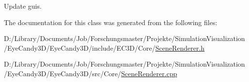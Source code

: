 Update guis. 



The documentation for this class was generated from the following files\+:\begin{DoxyCompactItemize}
\item 
D\+:/\+Library/\+Documents/\+Job/\+Forschungsmaster/\+Projekte/\+Simulation\+Visualization/\+Eye\+Candy3\+D/\+Eye\+Candy3\+D/include/\+E\+C3\+D/\+Core/\mbox{\hyperlink{_scene_renderer_8h}{Scene\+Renderer.\+h}}\item 
D\+:/\+Library/\+Documents/\+Job/\+Forschungsmaster/\+Projekte/\+Simulation\+Visualization/\+Eye\+Candy3\+D/\+Eye\+Candy3\+D/src/\+Core/\mbox{\hyperlink{_scene_renderer_8cpp}{Scene\+Renderer.\+cpp}}\end{DoxyCompactItemize}
